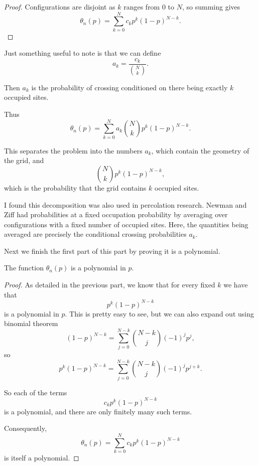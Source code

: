 \documentclass[11pt]{scrartcl}
\begin{document}
\begin{soln}
\begin{proof}
			Configurations are disjoint as $k$ ranges from $0$ to $N$, so summing
			gives
			\[
			\theta_n(p)
			=
			\sum_{k=0}^{N}
			c_kp^k(1-p)^{N-k}.
			\]
		\end{proof}
		
		\begin{remark}
            Just something useful to note is that we can define
		\[
		a_k=\frac{c_k}{\binom Nk}.
		\]
		
		Then $a_k$ is the probability of crossing conditioned on there being
		exactly $k$ occupied sites.
		
		Thus
		\[
		\theta_n(p)
		=
		\sum_{k=0}^{N}
		a_k\binom Nk p^k(1-p)^{N-k}.
		\]
		
		This separates the problem into the numbers $a_k$, which contain the
		geometry of the grid, and
		\[
		\binom Nk p^k(1-p)^{N-k},
		\]
		which is the probability that the grid contains $k$ occupied sites.
		
		I found this decomposition was also used in percolation research.
		Newman and Ziff \cite[Section~I, equation~(2)]{newman-ziff}
		had probabilities at a fixed occupation probability by
		averaging over configurations with a fixed number of occupied
		sites. Here, the quantities being averaged are precisely the
		conditional crossing probabilities $a_k$.
		
        \end{remark}
	
		
		Next we finish the first part of this part by proving it is a polynomial.
		\begin{claim*}
			The function $\theta_n(p)$ is a polynomial in $p$.
		\end{claim*}
		
		\begin{proof}
			As detailed in the previous part, we know that for every fixed $k$ we have that
			\[
			p^k(1-p)^{N-k}
			\]
			is a polynomial in $p$.
			This is pretty easy to see, but we can also expand out using binomial theorem 
			\[
			(1-p)^{N-k}
			=
			\sum_{j=0}^{N-k}
			\binom{N-k}{j}(-1)^j p^j,
			\]
			so
			\[
			p^k(1-p)^{N-k}
			=
			\sum_{j=0}^{N-k}
			\binom{N-k}{j}(-1)^j p^{j+k}.
			\]
			
			So each of the terms 
			\[
			c_kp^k(1-p)^{N-k}
			\]
			is a polynomial, and there are only finitely many such terms.
			
			Consequently,
			\[
			\boxed{
				\theta_n(p)
				=
				\sum_{k=0}^{N}
				c_kp^k(1-p)^{N-k}
			}
			\]
			is itself a polynomial.
		\end{proof}
		

\end{soln}
\end{document}

